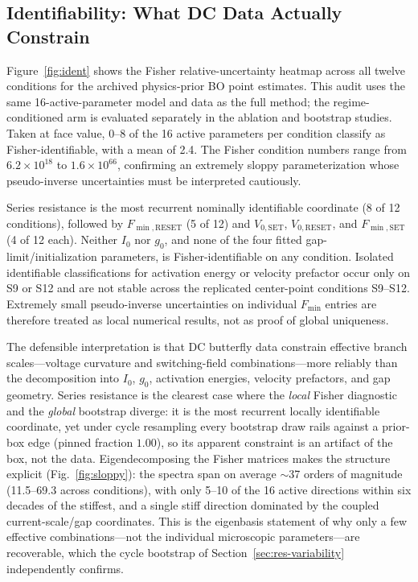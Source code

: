 \documentclass[journal]{IEEEtran}
\begin{document}
\subsection{Identifiability: What DC Data Actually Constrain}
\label{sec:res-ident}

Figure~\ref{fig:ident} shows the Fisher relative-uncertainty heatmap across
all twelve conditions for the archived physics-prior BO point estimates.
This audit uses the same 16-active-parameter model and data as the full
method; the regime-conditioned arm is evaluated separately in the ablation
and bootstrap studies.  Taken at face value, 0--8 of the 16 active
parameters per condition classify as Fisher-identifiable, with a mean of
2.4.  The Fisher condition numbers range from $6.2\times10^{18}$ to
$1.6\times10^{66}$, confirming an extremely sloppy parameterization whose
pseudo-inverse uncertainties must be interpreted cautiously.

Series resistance is the most recurrent nominally identifiable coordinate
(8 of 12 conditions), followed by $F_{\min,\mathrm{RESET}}$ (5 of 12) and
$V_{0,\mathrm{SET}}$, $V_{0,\mathrm{RESET}}$, and
$F_{\min,\mathrm{SET}}$ (4 of 12 each).  Neither $I_0$ nor $g_0$, and none
of the four fitted gap-limit/initialization parameters, is Fisher-identifiable
on any condition.  Isolated identifiable classifications for activation
energy or velocity prefactor occur only on S9 or S12 and are not stable
across the replicated center-point conditions S9--S12.  Extremely small
pseudo-inverse uncertainties on individual $F_{\min}$ entries are therefore
treated as local numerical results, not as proof of global uniqueness.

The defensible interpretation is that DC butterfly data constrain effective
branch scales---voltage curvature and switching-field combinations---more
reliably than the decomposition into $I_0$, $g_0$, activation energies,
velocity prefactors, and gap geometry.  Series resistance is the clearest case
where the \emph{local} Fisher diagnostic and the \emph{global} bootstrap
diverge: it is the most recurrent locally identifiable coordinate, yet under
cycle resampling every bootstrap draw rails against a prior-box edge (pinned
fraction $1.00$), so its apparent constraint is an artifact of the box, not the
data.  Eigendecomposing the Fisher matrices makes the structure explicit
(Fig.~\ref{fig:sloppy}): the spectra span on average $\sim$37 orders of
magnitude (11.5--69.3 across conditions), with only 5--10 of the 16 active
directions within six decades of the stiffest, and a single stiff direction
dominated by the coupled current-scale/gap coordinates.  This is the eigenbasis
statement of why only a few effective combinations---not the individual
microscopic parameters---are recoverable, which the cycle bootstrap of
Section~\ref{sec:res-variability} independently confirms.
\end{document}
